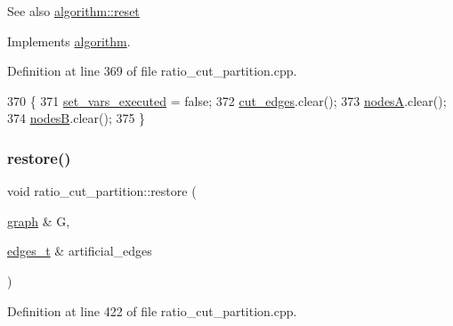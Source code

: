 \begin{DoxySeeAlso}{See also}
\mbox{\hyperlink{classalgorithm_a21aba63d066ae7897de6ca7d8425c408}{algorithm\+::reset}} 
\end{DoxySeeAlso}


Implements \mbox{\hyperlink{classalgorithm_a21aba63d066ae7897de6ca7d8425c408}{algorithm}}.



Definition at line 369 of file ratio\+\_\+cut\+\_\+partition.\+cpp.


\begin{DoxyCode}
370 \{
371     \mbox{\hyperlink{classratio__cut__partition_aa722d032cb59664894c6301ceee86729}{set\_vars\_executed}} = \textcolor{keyword}{false};
372     \mbox{\hyperlink{classratio__cut__partition_a5ab55eef04a72c0be731d848cb9a5d50}{cut\_edges}}.clear();
373     \mbox{\hyperlink{classratio__cut__partition_a871cc6bf77000205fec8ab6d3a28fc28}{nodesA}}.clear();
374     \mbox{\hyperlink{classratio__cut__partition_af207198b35e52e4055487f8ae8c23d8d}{nodesB}}.clear();
375 \}
\end{DoxyCode}
\mbox{\label{classratio__cut__partition_a0908d7b80b86fbc10ce94655abee5478}} 
\subsubsection{\texorpdfstring{restore()}{restore()}}
{\footnotesize\ttfamily void ratio\+\_\+cut\+\_\+partition\+::restore (\begin{DoxyParamCaption}\item[{\mbox{\hyperlink{classgraph}{graph}} \&}]{G,  }\item[{\mbox{\hyperlink{edge_8h_a8f9587479bda6cf612c103494b3858e3}{edges\+\_\+t}} \&}]{artificial\+\_\+edges }\end{DoxyParamCaption})\hspace{0.3cm}{\ttfamily [protected]}}



Definition at line 422 of file ratio\+\_\+cut\+\_\+partition.\+cpp.


